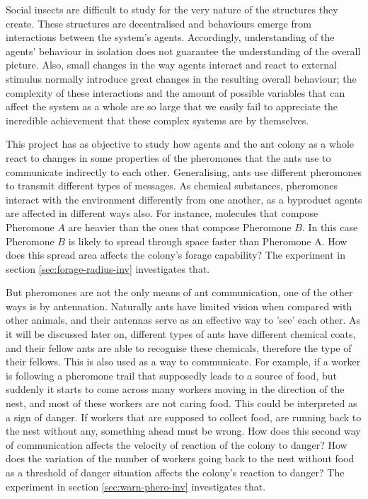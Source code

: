 Social insects are difficult to study for the very nature of the structures they create. These structures are decentralised and behaviours emerge from interactions between the system's agents. Accordingly, understanding of the agents' behaviour in isolation does not guarantee the understanding of the overall picture. Also, small changes in the way agents interact and react to external stimulus normally introduce great changes in the resulting overall behaviour; the complexity of these interactions and the amount of possible variables that can affect the system as a whole are so large that we easily fail to appreciate the incredible achievement that these complex systems are by themselves.

This project has as objective to study how agents and the ant colony as a whole react to changes in some properties of the pheromones that the ants use to communicate indirectly to each other. Generalising, ants use different pheromones to transmit different types of messages. As chemical substances, pheromones interact with the environment differently from one another, as a byproduct agents are affected in different ways also. For instance, molecules that compose Pheromone $A$ are heavier than the ones that compose Pheromone $B$. In this case Pheromone $B$ is likely to spread through space faster than Pheromone A. How does this spread area affects the colony's forage capability? The experiment in section \ref{sec:forage-radius-inv} investigates that. 

But pheromones are not the only means of ant communication, one of the other ways is by antennation. Naturally ants have limited vision when compared with other animals, and their antennas serve as an effective way to 'see' each other. As it will be discussed later on, different types of ants have different chemical coats, and their fellow ants are able to recognise these chemicals, therefore the type of their fellows. This is also used as a way to communicate. For example, if a worker is following a pheromone trail that supposedly leads to a source of food, but suddenly it starts to come across many workers moving in the direction of the nest, and most of these workers are not caring food. This could be interpreted as a sign of danger. If workers that are supposed to collect food, are running back to the nest without any, something ahead must be wrong. How does this second way of communication affects the velocity of reaction of the colony to danger? How does the variation of the number of workers going back to the nest without food as a threshold of danger situation affects the colony's reaction to danger? The experiment in section \ref{sec:warn-phero-inv} investigates that. 

